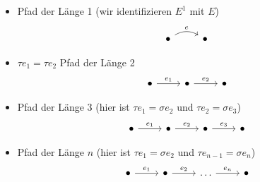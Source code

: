 \begin{example}
    \begin{itemize}
        \item Pfad der Länge 1 (wir identifizieren $E^1$ mit $E$)
        $$
        \begin{tikzcd}
            \bullet \arrow[r, "e", bend left] & \bullet
        \end{tikzcd}
        $$
        \item $\tau e_1 = \tau e_2$ Pfad der Länge 2
        $$
        \begin{tikzcd}
            \bullet \arrow[r, "e_1"] & \bullet \arrow[r, "e_2"] & \bullet
        \end{tikzcd}
        $$
        \item Pfad der Länge 3 (hier ist $\tau e_1 = \sigma e_2$ und $\tau e_2 = \sigma e_3$)
        $$
        \begin{tikzcd}
            \bullet \arrow[r, "e_1"] & \bullet \arrow[r, "e_2"] & \bullet \arrow[r, "e_3"] & \bullet
        \end{tikzcd}
        $$
        \item Pfad der Länge $n$ (hier ist $\tau e_1 = \sigma e_2$ und $\tau e_{n-1} = \sigma e_n$) 
        $$
        \begin{tikzcd}
            \bullet \arrow[r, "e_1"] & \bullet \arrow[r, "e_2"] & \dots \arrow[r, "e_n"] & \bullet
        \end{tikzcd}
        $$
    \end{itemize}
\end{example}
